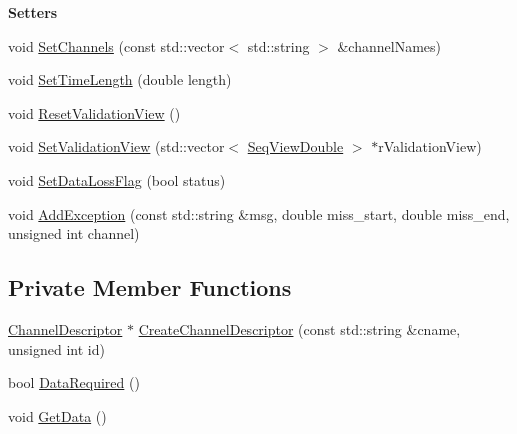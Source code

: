 \begin{Indent}\textbf{ Setters}\par
\begin{DoxyCompactItemize}
\item 
void \hyperlink{classtsa_1_1_frame_i_stream_a5f23c61f80f232c70717dd2b021fae6d}{Set\+Channels} (const std\+::vector$<$ std\+::string $>$ \&channel\+Names)
\item 
void \hyperlink{classtsa_1_1_frame_i_stream_a8fb9dea502f55380a8a21e2976efa9b2}{Set\+Time\+Length} (double length)
\item 
void \hyperlink{classtsa_1_1_frame_i_stream_a1f12e9321856878c40266cd97890e3d4}{Reset\+Validation\+View} ()
\item 
void \hyperlink{classtsa_1_1_frame_i_stream_a89e7cd73df5fb44c8235166d8b9ccd12}{Set\+Validation\+View} (std\+::vector$<$ \hyperlink{namespacetsa_ac599574bcc094eda25613724b8f3ca9e}{Seq\+View\+Double} $>$ $\ast$r\+Validation\+View)
\item 
void \hyperlink{classtsa_1_1_frame_i_stream_a188c2351c1717037f955c959e61629ff}{Set\+Data\+Loss\+Flag} (bool status)
\item 
void \hyperlink{classtsa_1_1_frame_i_stream_a7a8b3b63fdc352215672bdbdcefdd295}{Add\+Exception} (const std\+::string \&msg, double miss\+\_\+start, double miss\+\_\+end, unsigned int channel)
\end{DoxyCompactItemize}
\end{Indent}
\subsection*{Private Member Functions}
\begin{DoxyCompactItemize}
\item 
\hyperlink{classtsa_1_1_channel_descriptor}{Channel\+Descriptor} $\ast$ \hyperlink{classtsa_1_1_frame_i_stream_a6a3a7e4523fed47c0055cb7ae1fd9435}{Create\+Channel\+Descriptor} (const std\+::string \&cname, unsigned int id)
\item 
bool \hyperlink{classtsa_1_1_frame_i_stream_af13e8a06bafa6e63bde6871d763425f1}{Data\+Required} ()
\item 
void \hyperlink{classtsa_1_1_frame_i_stream_a2f95f7fcf1e17f2d1b4a6b3dca976e76}{Get\+Data} ()
\end{DoxyCompactItemize}

